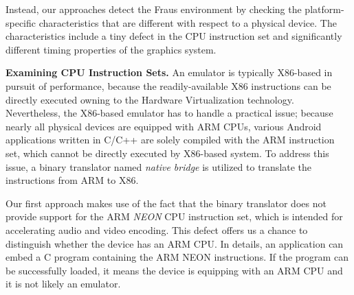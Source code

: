 \documentclass[conference]{IEEEtranl}
\begin{document}
	Instead, our approaches detect the Fraus environment by checking the platform-specific characteristics that are different with respect to a physical device.
	The characteristics include a tiny defect in the CPU instruction set and significantly different timing properties of the graphics system.

	\textbf{Examining CPU Instruction Sets.}
	An emulator is typically X86-based in pursuit of performance, because the readily-available X86 instructions can be directly executed owning to the Hardware Virtualization technology.
	Nevertheless, the X86-based emulator has to handle a practical issue; because nearly all physical devices are equipped with ARM CPUs, various Android applications written in C/C++ are solely compiled with the ARM instruction set, which cannot be directly executed by X86-based system. To address this issue, a binary translator named \textit{native bridge} is utilized to translate the instructions from ARM to X86. 

	Our first approach makes use of the fact that the binary translator does not provide support for the ARM \textit{NEON} CPU instruction set, which is intended for accelerating audio and video encoding. This defect offers us a chance to distinguish whether the device has an ARM CPU. In details, an application can embed a C program containing the ARM NEON instructions. If the program can be successfully loaded, it means the device is equipping with an ARM CPU and it is not likely an emulator. 

\end{document}
